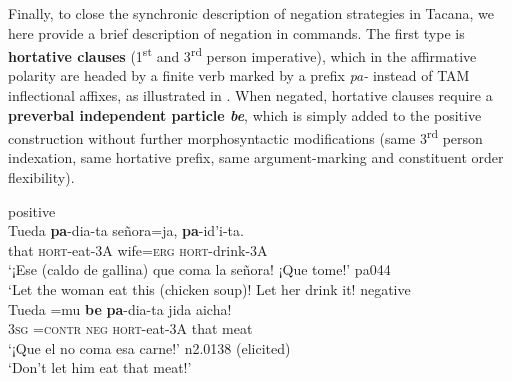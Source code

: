 \documentclass[output=paper]{langsci/langscibook}
\begin{document}
Finally, to close the synchronic description of negation strategies in
Tacana, we here provide a brief description of negation in commands.
The first type is \textbf{hortative clauses} (1\textsuperscript{st} and
3\textsuperscript{rd} person imperative), which in the affirmative polarity
are headed by a finite verb marked by a prefix \textit{pa-} instead of TAM
inflectional affixes, as illustrated in .
When negated, hortative clauses require a \textbf{preverbal independent
particle \textit{be}}, which is simply added to the positive construction
without further morphosyntactic modifications (same 3\textsuperscript{rd}
person indexation, same hortative prefix, same argument-marking and constituent order flexibility).
%
\begin{exe}\ex\label{ex:tacana-hortative}
\begin{xlist}
\ex\label{ex:tacana-hortative-positive} positive\\
\gll
{}Tueda \textbf{pa}-dia-ta señora=ja,
\textbf{pa}-id'i-ta.\\
that \textsc{hort}-eat-3A wife\textsc{=erg} \textsc{hort-}drink-3A\\
\glt `¡Ese (caldo de gallina) que coma la señora! ¡Que tome!' pa044\\
‘Let the woman eat this (chicken soup)! Let her drink it!
\ex\label{ex:tacana-hortative-negative} negative\\
\gll
{}Tueda =mu \textbf{be} \textbf{pa}-dia-ta
jida aicha{\cb}!\\
3\textsc{sg} =\textsc{contr} \textsc{neg} \textsc{hort-}eat-3A that meat\\
\glt `¡Que el no coma esa carne!' n2.0138 (elicited)\\
`Don't let him eat that meat!'
\end{xlist}\end{exe}
\end{document}
